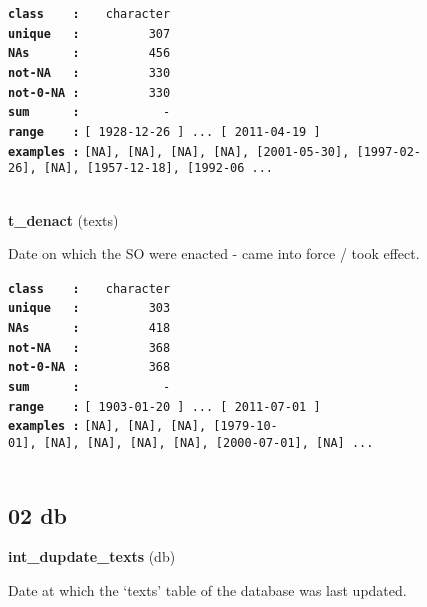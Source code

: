 \documentclass[]{article}
\begin{document}
\textbf{\texttt{class\ \ \ \ :}} \texttt{~~~character}\\
\textbf{\texttt{unique\ \ \ :}} \texttt{~~~~~~~~~307}\\
\textbf{\texttt{NAs\ \ \ \ \ \ :}} \texttt{~~~~~~~~~456}\\
\textbf{\texttt{not-NA\ \ \ :}} \texttt{~~~~~~~~~330}\\
\textbf{\texttt{not-0-NA\ :}} \texttt{~~~~~~~~~330}\\
\textbf{\texttt{sum\ \ \ \ \ \ :}} \texttt{~~~~~~~~~~~-}\\
\textbf{\texttt{range\ \ \ \ :}}
\texttt{{[}\ 1928-12-26\ {]}\ ...\ {[}\ 2011-04-19\ {]}}\\
\textbf{\texttt{examples\ :}}
\texttt{{[}NA{]},\ {[}NA{]},\ {[}NA{]},\ {[}NA{]},\ {[}2001-05-30{]},\ {[}1997-02-26{]},\ {[}NA{]},\ {[}1957-12-18{]},\ {[}1992-06\ ...}\\

~

\textbf{t\_denact} (texts)

Date on which the SO were enacted - came into force / took effect.

\textbf{\texttt{class\ \ \ \ :}} \texttt{~~~character}\\
\textbf{\texttt{unique\ \ \ :}} \texttt{~~~~~~~~~303}\\
\textbf{\texttt{NAs\ \ \ \ \ \ :}} \texttt{~~~~~~~~~418}\\
\textbf{\texttt{not-NA\ \ \ :}} \texttt{~~~~~~~~~368}\\
\textbf{\texttt{not-0-NA\ :}} \texttt{~~~~~~~~~368}\\
\textbf{\texttt{sum\ \ \ \ \ \ :}} \texttt{~~~~~~~~~~~-}\\
\textbf{\texttt{range\ \ \ \ :}}
\texttt{{[}\ 1903-01-20\ {]}\ ...\ {[}\ 2011-07-01\ {]}}\\
\textbf{\texttt{examples\ :}}
\texttt{{[}NA{]},\ {[}NA{]},\ {[}NA{]},\ {[}1979-10-01{]},\ {[}NA{]},\ {[}NA{]},\ {[}NA{]},\ {[}NA{]},\ {[}2000-07-01{]},\ {[}NA{]}\ ...}\\

~

\subsection{02 db}\label{db}

\textbf{int\_dupdate\_texts} (db)

Date at which the `texts' table of the database was last updated.
\end{document}
